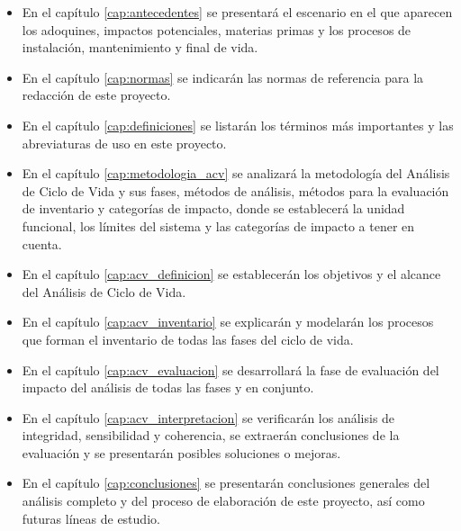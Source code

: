 \begin{itemize}
  \item En el capítulo \ref{cap:antecedentes} se presentará el escenario en el que aparecen los adoquines, impactos potenciales, materias primas y los procesos de instalación, mantenimiento y final de vida.
  \item En el capítulo \ref{cap:normas} se indicarán las normas de referencia para la redacción de este proyecto.
  \item En el capítulo \ref{cap:definiciones} se listarán los términos más importantes y las abreviaturas de uso en este proyecto.
  \item En el capítulo \ref{cap:metodologia_acv} se analizará la metodología del Análisis de Ciclo de Vida y sus fases, métodos de análisis, métodos para la evaluación de inventario y categorías de impacto, donde se establecerá la unidad funcional, los límites del sistema y las categorías de impacto a tener en cuenta.
  \item En el capítulo \ref{cap:acv_definicion} se establecerán los objetivos y el alcance del Análisis de Ciclo de Vida.
  \item En el capítulo \ref{cap:acv_inventario} se explicarán y modelarán los procesos que forman el inventario de todas las fases del ciclo de vida.
  \item En el capítulo \ref{cap:acv_evaluacion} se desarrollará la fase de evaluación del impacto del análisis de todas las fases y en conjunto.
  \item En el capítulo \ref{cap:acv_interpretacion} se verificarán los análisis de integridad, sensibilidad y coherencia, se extraerán conclusiones de la evaluación y se presentarán posibles soluciones o mejoras.
  \item En el capítulo \ref{cap:conclusiones} se presentarán conclusiones generales del análisis completo y del proceso de elaboración de este proyecto, así como futuras líneas de estudio.
\end{itemize}
